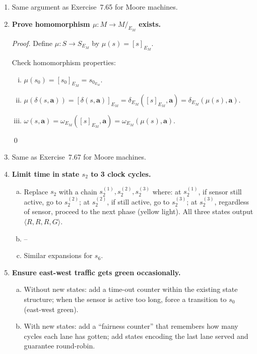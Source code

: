 \begin{enumerate}[{7.}1.]
\item Same argument as Exercise~7.65 for Moore machines.

\item \textbf{Prove homomorphism $\mu:M\to M/_{E_M}$ exists.}

\begin{proof}
Define $\mu:S\to S_{E_M}$ by $\mu(s)=[s]_{E_M}$.

Check homomorphism properties:
\begin{enumerate}[(i)]
  \item $\mu(s_0)=[s_0]_{E_M}=s_{0_{E_M}}$. \checkmark
  \item $\mu(\delta(s,\pmb{a}))=[\delta(s,\pmb{a})]_{E_M}=\delta_{E_M}([s]_{E_M},\pmb{a})=\delta_{E_M}(\mu(s),\pmb{a})$. \checkmark
  \item $\omega(s,\pmb{a})=\omega_{E_M}([s]_{E_M},\pmb{a})=\omega_{E_M}(\mu(s),\pmb{a})$. \checkmark
\end{enumerate} \qed
\end{proof}

\item Same as Exercise~7.67 for Moore machines.

\item \textbf{Limit time in state $s_2$ to 3 clock cycles.}

\begin{enumerate}[(a)]
  \item Replace $s_2$ with a chain $s_2^{(1)},s_2^{(2)},s_2^{(3)}$ where: at $s_2^{(1)}$, if sensor still active, go to $s_2^{(2)}$; at $s_2^{(2)}$, if still active, go to $s_2^{(3)}$; at $s_2^{(3)}$, regardless of sensor, proceed to the next phase (yellow light).  All three states output $\langle R,R,R,G\rangle$.

  \item--\item[c.] Similar expansions for $s_6$.
\end{enumerate}

\item \textbf{Ensure east-west traffic gets green occasionally.}

\begin{enumerate}[(a)]
  \item Without new states: add a time-out counter within the existing state structure; when the sensor is active too long, force a transition to $s_0$ (east-west green).

  \item With new states: add a ``fairness counter'' that remembers how many cycles each lane has gotten; add states encoding the last lane served and guarantee round-robin.
\end{enumerate}


\end{enumerate}

